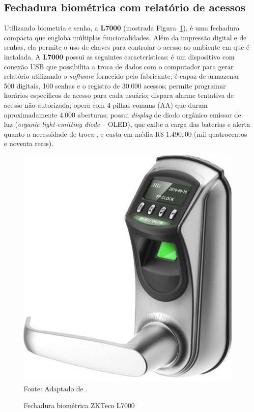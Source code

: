  \subsection{Fechadura biométrica com relatório de acessos}

 Utilizando biometria e senha, a \textbf{L7000} (mostrada Figura~\ref{zktecol7000}), é uma fechadura compacta que engloba múltiplas funcionalidades. Além da impressão digital e de senhas, ela permite o uso de chaves para controlar o acesso ao ambiente em que é instalada. A \textbf{L7000} possui as seguintes características: é um dispositivo com conexão USB que possibilita a troca de dados com o computador para gerar relatório utilizando o \textit{software} fornecido pelo fabricante; é capaz de armazenar 500 digitais, 100 senhas e o registro de 30.000 acessos; permite programar horários específicos de acesso para cada usuário; dispara alarme tentativa de acesso não autorizada; opera com 4 pilhas comuns (AA) que duram aproximadamente 4.000 aberturas; possui \textit{display} de diodo orgânico emissor de luz (\textit{organic light-emitting diode} -- OLED), que exibe a carga das baterias e alerta quanto a necessidade de troca \cite{zktecol7000}; e custa em média R{\$} $1.490,00$ (mil quatrocentos e noventa reais).

  \begin{figure}[!ht]
  \begin{center}
  \caption{Fechadura biométrica  ZKTeco L7000}
  \includegraphics[scale=1]{figuras/cap3/zktecol7000.jpg}\\
  Fonte: Adaptado de \cite{zktecol7000}.
  \label{zktecol7000}
  \end{center}
  \end{figure}
  


